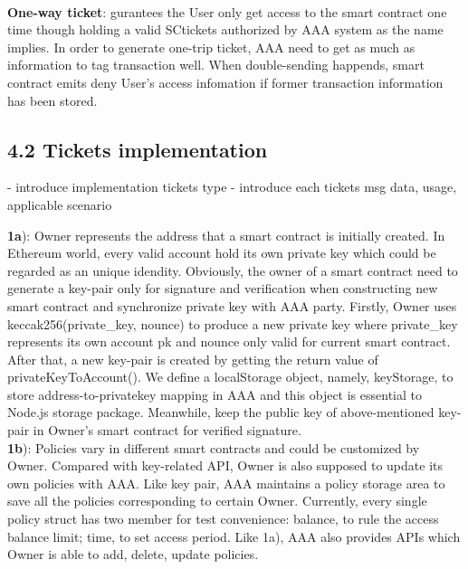 \\\textbf{One-way ticket}: gurantees the User only get access to the smart contract one time though holding a valid SCtickets authorized by AAA system as the name implies. In order to generate one-trip ticket, AAA need to get as much as information to tag transaction well. When double-sending happends, smart contract emits deny User's access infomation if former transaction information has been stored.

\subsection*{4.2 Tickets implementation}
- introduce implementation tickets type 
- introduce each tickets msg data, usage, applicable scenario

\noindent \textbf{1a}): Owner represents the address that a smart contract is initially created. In Ethereum world, every valid account hold its own private key which could be regarded as an unique idendity. Obviously, the owner of a smart contract need to generate a key-pair only for signature and verification when constructing new smart contract and synchronize private key with AAA party. Firstly, Owner uses keccak256(private\_key, nounce) to produce a new private key where private\_key represents its own account pk and nounce only valid for current smart contract. After that, a new key-pair is created by getting the return value of privateKeyToAccount(). We define a localStorage object, namely, keyStorage, to store address-to-privatekey mapping in AAA and this object is essential to Node.js storage package. Meanwhile, keep the public key of above-mentioned key-pair in Owner's smart contract for verified signature.
\\\noindent \textbf{1b}): Policies vary in different smart contracts and could be customized by Owner. Compared with key-related API, Owner is also supposed to update its own policies with AAA. Like key pair, AAA maintains a policy storage area to save all the policies corresponding to certain Owner. Currently,  every single policy struct has two member for test convenience: balance, to rule the access balance limit; time, to set access period. Like 1a), AAA also provides APIs which Owner is able to add, delete, update policies. 
